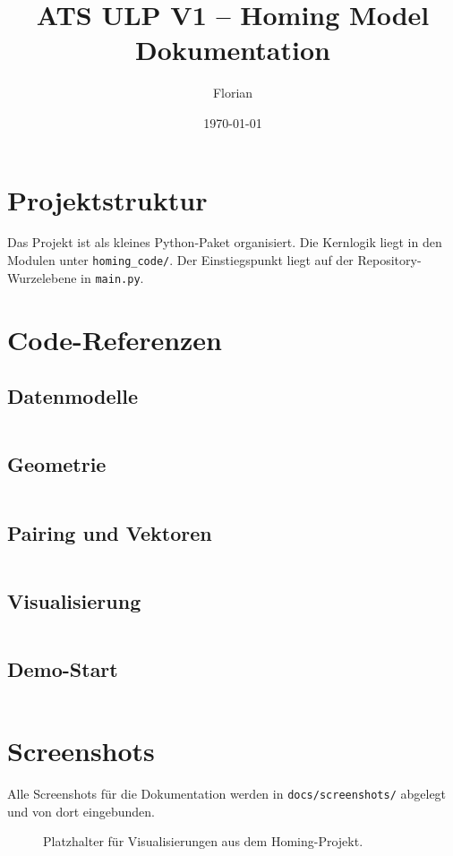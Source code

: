 \documentclass[11pt,a4paper]{article}
\title{ATS ULP V1 -- Homing Model Dokumentation}
\author{Florian}
\date{\today}
\begin{document}
\maketitle

\section{Projektstruktur}
Das Projekt ist als kleines Python-Paket organisiert. Die Kernlogik liegt in den Modulen unter \texttt{homing\_code/}. Der Einstiegspunkt liegt auf der Repository-Wurzelebene in \texttt{main.py}.

\section{Code-Referenzen}
\subsection{Datenmodelle}
\inputminted[fontsize=\small,linenos,breaklines]{python}{../../homing_code/models.py}

\subsection{Geometrie}
\inputminted[fontsize=\small,linenos,breaklines]{python}{../../homing_code/geometry.py}

\subsection{Pairing und Vektoren}
\inputminted[fontsize=\small,linenos,breaklines]{python}{../../homing_code/pairing.py}

\subsection{Visualisierung}
\inputminted[fontsize=\small,linenos,breaklines]{python}{../../homing_code/visualization.py}

\subsection{Demo-Start}
\inputminted[fontsize=\small,linenos,breaklines]{python}{../../main.py}

\section{Screenshots}
Alle Screenshots für die Dokumentation werden in \texttt{docs/screenshots/} abgelegt und von dort eingebunden.

\begin{figure}[h]
  \centering
  \caption{Platzhalter für Visualisierungen aus dem Homing-Projekt.}
\end{figure}
\end{document}
